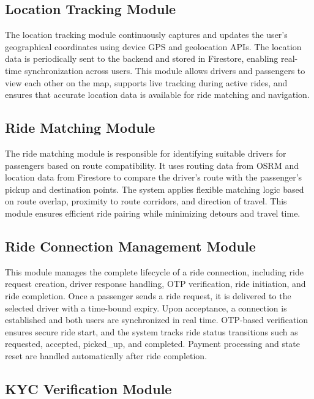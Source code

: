 \documentclass[10pt,a4paper]{report}
\begin{document}
\subsection{Location Tracking Module}

\justify\large The location tracking module continuously captures and updates the user's geographical coordinates using device GPS and geolocation APIs. The location data is periodically sent to the backend and stored in Firestore, enabling real-time synchronization across users. This module allows drivers and passengers to view each other on the map, supports live tracking during active rides, and ensures that accurate location data is available for ride matching and navigation.

\subsection{Ride Matching Module}

\justify\large The ride matching module is responsible for identifying suitable drivers for passengers based on route compatibility. It uses routing data from OSRM and location data from Firestore to compare the driver's route with the passenger’s pickup and destination points. The system applies flexible matching logic based on route overlap, proximity to route corridors, and direction of travel. This module ensures efficient ride pairing while minimizing detours and travel time.

\subsection{Ride Connection Management Module}

\justify\large This module manages the complete lifecycle of a ride connection, including ride request creation, driver response handling, OTP verification, ride initiation, and ride completion. Once a passenger sends a ride request, it is delivered to the selected driver with a time-bound expiry. Upon acceptance, a connection is established and both users are synchronized in real time. OTP-based verification ensures secure ride start, and the system tracks ride status transitions such as requested, accepted, picked\_up, and completed. Payment processing and state reset are handled automatically after ride completion.

\subsection{KYC Verification Module}
\end{document}
